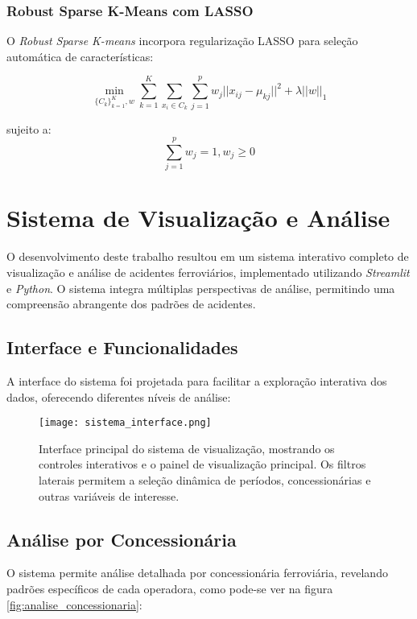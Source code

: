 \documentclass[conference]{IEEEtran}
\begin{document}
\subsubsection{Robust Sparse K-Means com LASSO}
O \textit{Robust Sparse K-means} \cite{b2} incorpora regularização LASSO para seleção automática de características:

\begin{equation}
\min_{\{C_k\}_{k=1}^K, w} \sum_{k=1}^K \sum_{x_i \in C_k} \sum_{j=1}^p w_j||x_{ij} - \mu_{kj}||^2 + \lambda||w||_1
\end{equation}

sujeito a:
\begin{equation}
\sum_{j=1}^p w_j = 1, w_j \geq 0
\end{equation}

\section{Sistema de Visualização e Análise}

O desenvolvimento deste trabalho resultou em um sistema interativo completo de visualização e análise de acidentes ferroviários, implementado utilizando \textit{Streamlit} e \textit{Python}. O sistema integra múltiplas perspectivas de análise, permitindo uma compreensão abrangente dos padrões de acidentes.

\subsection{Interface e Funcionalidades}

A interface do sistema foi projetada para facilitar a exploração interativa dos dados, oferecendo diferentes níveis de análise:

\begin{figure}[!htb]
    \centering
    \texttt{[image: sistema\_interface.png]}
    \caption{Interface principal do sistema de visualização, mostrando os controles interativos e o painel de visualização principal. Os filtros laterais permitem a seleção dinâmica de períodos, concessionárias e outras variáveis de interesse.}
    \label{fig:sistema_interface}
\end{figure}

\subsection{Análise por Concessionária}

O sistema permite análise detalhada por concessionária ferroviária, revelando padrões específicos de cada operadora, como pode-se ver na figura \ref{fig:analise_concessionaria}:
\end{document}
